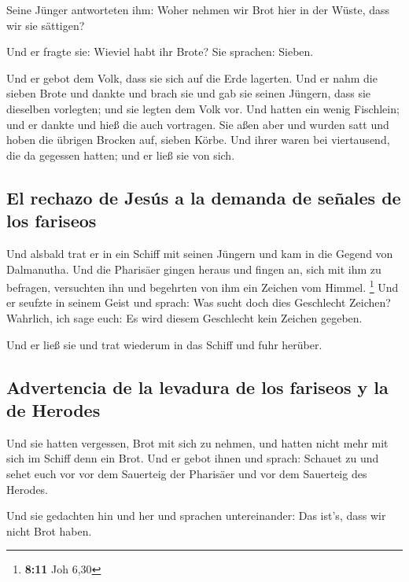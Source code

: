  Seine Jünger antworteten ihm: Woher nehmen wir Brot hier
in der Wüste, dass wir sie sättigen?

 Und er fragte sie: Wieviel habt ihr Brote? Sie sprachen:
Sieben.

 Und er gebot dem Volk, dass sie sich auf die Erde
lagerten. Und er nahm die sieben Brote und dankte und brach sie und gab
sie seinen Jüngern, dass sie dieselben vorlegten; und sie legten dem
Volk vor.  Und hatten ein wenig Fischlein; und er dankte
und hieß die auch vortragen.  Sie aßen aber und wurden
satt und hoben die übrigen Brocken auf, sieben Körbe.  Und
ihrer waren bei viertausend, die da gegessen hatten; und er ließ sie von
sich.

\hypertarget{el-rechazo-de-jesuxfas-a-la-demanda-de-seuxf1ales-de-los-fariseos}{%
\subsection{El rechazo de Jesús a la demanda de señales de los
fariseos}\label{el-rechazo-de-jesuxfas-a-la-demanda-de-seuxf1ales-de-los-fariseos}}

 Und alsbald trat er in ein Schiff mit seinen Jüngern und
kam in die Gegend von Dalmanutha.  Und die Pharisäer
gingen heraus und fingen an, sich mit ihm zu befragen, versuchten ihn
und begehrten von ihm ein Zeichen vom Himmel. \footnote{\textbf{8:11}
  Joh 6,30}  Und er seufzte in seinem Geist und sprach:
Was sucht doch dies Geschlecht Zeichen? Wahrlich, ich sage euch: Es wird
diesem Geschlecht kein Zeichen gegeben.

 Und er ließ sie und trat wiederum in das Schiff und fuhr
herüber.

\hypertarget{advertencia-de-la-levadura-de-los-fariseos-y-la-de-herodes}{%
\subsection{Advertencia de la levadura de los fariseos y la de
Herodes}\label{advertencia-de-la-levadura-de-los-fariseos-y-la-de-herodes}}

 Und sie hatten vergessen, Brot mit sich zu nehmen, und
hatten nicht mehr mit sich im Schiff denn ein Brot.  Und
er gebot ihnen und sprach: Schauet zu und sehet euch vor vor dem
Sauerteig der Pharisäer und vor dem Sauerteig des Herodes.

 Und sie gedachten hin und her und sprachen
untereinander: Das ist's, dass wir nicht Brot haben.

